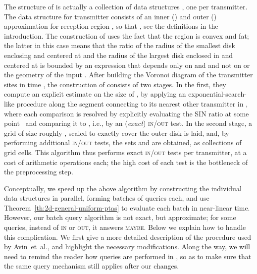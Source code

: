 \documentclass[11pt]{article}
\theoremstyle{remark}
\begin{document}
The structure of \cite{aeklpr-sdciawn-12} is actually a collection of  data structures , one per transmitter.
The data structure  for transmitter  consists of an inner () and outer () approximation for reception region , so that , see the definitions in the introduction.  
The construction of  uses the fact that 
the region  is convex and fat; the latter in this case means that the ratio of the radius of the smallest disk enclosing  and centered at  and the radius of the largest disk enclosed in  and centered at  is  bounded by an expression that depends only on  and  and not on  or the geometry of the input \cite{aeklpr-sdciawn-12}.
After building the Voronoi diagram of the transmitter sites in  time \cite{bcko-cgaa-08},
the construction of  consists of two stages. In the first,
they compute an explicit estimate on the size of , by applying an exponential-search-like procedure along the segment connecting  to its nearest other transmitter  in , where
each comparison is resolved by explicitly evaluating the SIN ratio at some point~ and comparing it to , i.e., by an (\emph{exact}) \textsc{in/out} test. In the second stage, a grid of size roughly , scaled to exactly cover the outer disk is laid, and, by performing  additional \textsc{in/out} tests, the sets  and  are obtained, as collections of grid cells.
This algorithm thus performs  exact \textsc{in/out} tests per transmitter, at a cost of  arithmetic operations each; the high cost of each test is the bottleneck of the preprocessing step.

Conceptually, we speed up the above algorithm by constructing the  individual data structures  in parallel, forming  batches of  queries each, and use Theorem~\ref{th:2d-general-uniform-ptas} to evaluate each batch in near-linear time.  However, our batch query algorithm is not exact, but approximate; for some queries, instead of \textsc{in} or \textsc{out}, it answers \textsc{maybe}.  Below we explain how to handle this complication.  We first give a more detailed description of the procedure used by Avin~et~al., and highlight the necessary modifications.  Along the way, we will need to remind the reader how queries are performed in \cite{aeklpr-sdciawn-12}, so as to make sure that the same query mechanism still applies after our changes.
\end{document}
